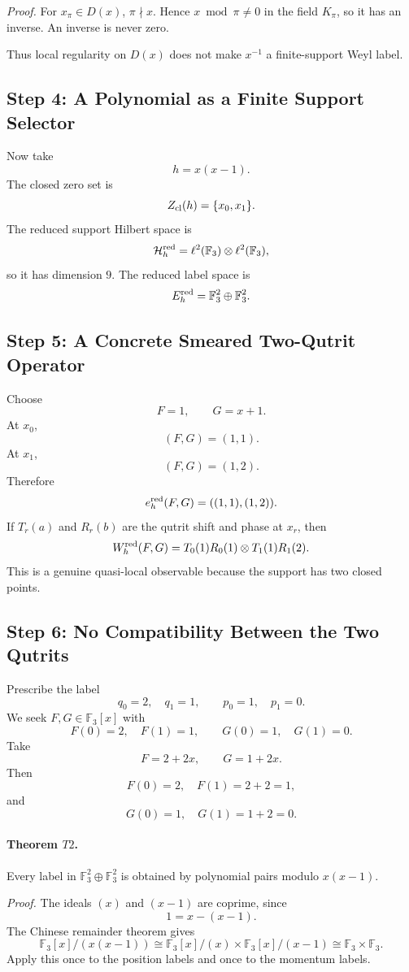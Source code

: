 \emph{Proof.}
For \(x_\pi\in D(x)\), \(\pi\nmid x\).  Hence \(x\bmod\pi\ne0\) in the field
\(K_\pi\), so it has an inverse.  An inverse is never zero.

Thus local regularity on \(D(x)\) does not make \(x^{-1}\) a finite-support
Weyl label.

\subsection{Step 4: A Polynomial as a Finite Support Selector}
Now take
\[
  h=x(x-1).
\]
The closed zero set is
\[
  Z_{\rm cl}(h)=\{x_0,x_1\}.
\]
The reduced support Hilbert space is
\[
  \mathcal H_h^{\rm red}
  =
  \ell^2(\mathbb F_3)\otimes\ell^2(\mathbb F_3),
\]
so it has dimension \(9\).  The reduced label space is
\[
  E_h^{\rm red}=\mathbb F_3^2\oplus\mathbb F_3^2.
\]

\subsection{Step 5: A Concrete Smeared Two-Qutrit Operator}
Choose
\[
  F=1,\qquad G=x+1.
\]
At \(x_0\),
\[
  (F,G)=(1,1).
\]
At \(x_1\),
\[
  (F,G)=(1,2).
\]
Therefore
\[
  e_h^{\rm red}(F,G)=((1,1),(1,2)).
\]
If \(T_r(a)\) and \(R_r(b)\) are the qutrit shift and phase at \(x_r\), then
\[
  W_h^{\rm red}(F,G)
  =
  T_0(1)R_0(1)\otimes T_1(1)R_1(2).
\]
This is a genuine quasi-local observable because the support has two closed
points.
\subsection{Step 6: No Compatibility Between the Two Qutrits}
Prescribe the label
\[
  q_0=2,\quad q_1=1,\qquad p_0=1,\quad p_1=0.
\]
We seek \(F,G\in\mathbb F_3[x]\) with
\[
  F(0)=2,\quad F(1)=1,\qquad G(0)=1,\quad G(1)=0.
\]
Take
\[
  F=2+2x,\qquad G=1+2x.
\]
Then
\[
  F(0)=2,\quad F(1)=2+2=1,
\]
and
\[
  G(0)=1,\quad G(1)=1+2=0.
\]
\paragraph{Theorem \(T2\).}
Every label in \(\mathbb F_3^2\oplus\mathbb F_3^2\) is obtained by polynomial
pairs modulo \(x(x-1)\).

\emph{Proof.}
The ideals \((x)\) and \((x-1)\) are coprime, since
\[
  1=x-(x-1).
\]
The Chinese remainder theorem gives
\[
  \mathbb F_3[x]/(x(x-1))
  \cong
  \mathbb F_3[x]/(x)\times\mathbb F_3[x]/(x-1)
  \cong \mathbb F_3\times\mathbb F_3.
\]
Apply this once to the position labels and once to the momentum labels.

